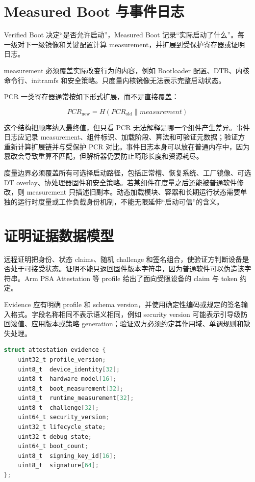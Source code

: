 \section{Measured Boot 与事件日志}

Verified Boot 决定“是否允许启动”，Measured Boot 记录“实际启动了什么”。每一级对下一级镜像和关键配置计算 measurement，并扩展到受保护寄存器或证明日志。

measurement 必须覆盖实际改变行为的内容，例如 Bootloader 配置、DTB、内核命令行、initramfs 和安全策略。只度量内核镜像无法表示完整启动状态。

PCR 一类寄存器通常按如下形式扩展，而不是直接覆盖：

\[
  PCR_{\mathrm{new}} = H(PCR_{\mathrm{old}} \parallel measurement)
\]

这个结构把顺序纳入最终值，但只看 PCR 无法解释是哪一个组件产生差异。事件日志应记录 measurement、组件标识、加载阶段、算法和可验证元数据；验证方重新计算扩展链并与受保护 PCR 对比。事件日志本身可以放在普通内存中，因为篡改会导致重算不匹配，但解析器仍要防止畸形长度和资源耗尽。

度量边界必须覆盖所有可选择启动路径，包括正常槽、恢复系统、工厂镜像、可选 DT overlay、协处理器固件和安全策略。若某组件在度量之后还能被普通软件修改，则 measurement 只描述旧副本。动态加载模块、容器和长期运行状态需要单独的运行时度量或工作负载身份机制，不能无限延伸“启动可信”的含义。

\section{证明证据数据模型}

远程证明把身份、状态 claims、随机 challenge 和签名组合，使验证方判断设备是否处于可接受状态。证明不能只返回固件版本字符串，因为普通软件可以伪造该字符串。Arm PSA Attestation 等 profile 给出了面向受限设备的 claim 与 token 约定\cite{arm-psa-attestation-api}。

Evidence 应有明确 profile 和 schema version，并使用确定性编码或规定的签名输入格式。字段名称相同不表示语义相同，例如 security version 可能表示引导级防回滚值、应用版本或策略 generation；验证双方必须约定其作用域、单调规则和缺失处理。

\noindent\begin{minipage}{\textwidth}
\begin{lstlisting}[language=C,caption={远程证明响应的逻辑字段}]
struct attestation_evidence {
    uint32_t profile_version;
    uint8_t  device_identity[32];
    uint8_t  hardware_model[16];
    uint8_t  boot_measurement[32];
    uint8_t  runtime_measurement[32];
    uint8_t  challenge[32];
    uint64_t security_version;
    uint32_t lifecycle_state;
    uint32_t debug_state;
    uint64_t boot_count;
    uint8_t  signing_key_id[16];
    uint8_t  signature[64];
};
\end{lstlisting}
\end{minipage}

